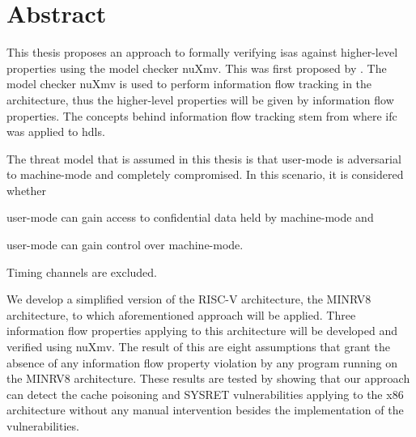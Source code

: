 \chapter*{\centering Abstract}

This thesis proposes an approach to formally verifying \glspl{isa} against higher-level properties using the model checker nuXmv.
This was first proposed by \cite{Reid17}.
The model checker nuXmv is used to perform information flow tracking in the architecture, thus the higher-level properties will be given by information flow properties.
The concepts behind information flow tracking stem from \cite{Ferraiuolo17} where \gls{ifc} was applied to \glspl{hdl}.

The threat model that is assumed in this thesis is that user-mode is adversarial to machine-mode and completely compromised.
In this scenario, it is considered whether
\begin{enumerate*}[label=\alph*)]
    \item user-mode can gain access to confidential data held by machine-mode and
    \item user-mode can gain control over machine-mode.
\end{enumerate*}
Timing channels are excluded.

We develop a simplified version of the RISC-V architecture, the MINRV8 architecture, to which aforementioned approach will be applied.
Three information flow properties applying to this architecture will be developed and verified using nuXmv.
The result of this are eight assumptions that grant the absence of any information flow property violation by any program running on the MINRV8 architecture.
These results are tested by showing that our approach can detect the cache poisoning \cite{Wojtczuk09} and SYSRET vulnerabilities \cite{SYSRET-vuln,Dunlap19} applying to the x86 architecture without any manual intervention besides the implementation of the vulnerabilities.
